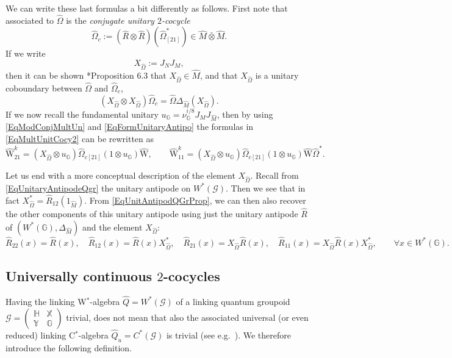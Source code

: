 \documentclass[reqno]{amsart}
\numberwithin{equation}{section}
\newcommand{\G}{\mathbb{G}}
\newcommand{\Hh}{\mathbb{H}}
\newcommand{\X}{\mathbb{X}}
\newcommand{\Y}{\mathbb{Y}}
\newcommand{\msG}{\mathscr{G}}
\newcommand{\ww}{\mathrm{W}}
\begin{document}
We can write these last formulas a bit differently as follows. First note that associated to $\hat{\Omega}$ is the \emph{conjugate unitary $2$-cocycle}
\[
\hat{\Omega}_c :=  (\hat{R}\otimes \hat{R})(\hat{\Omega}_{[21]}^*) \in \hat{M}\bar{\otimes}\hat{M}. 
\]
If we write 
\[
X_{\hat{\Omega}} := J_NJ_M,
\]
then it can be shown \cite{DC11b}*{Proposition 6.3} that $X_{\hat{\Omega}}\in \hat{M}$, and that $X_{\hat{\Omega}}$ is a unitary coboundary between $\hat{\Omega}$ and $\hat{\Omega}_c$,
\begin{equation}
(X_{\hat{\Omega}}\otimes X_{\hat{\Omega}})\hat{\Omega}_c = \hat{\Omega}\Delta_{\hat{M}}(X_{\hat{\Omega}}). 
\end{equation}
If we now recall the fundamental unitary $u_{\G} = \nu_{\G}^{i/8}J_{M}J_{\hat{M}}$, then by using \eqref{EqModConjMultUn} and \eqref{EqFormUnitaryAntipo} the formulas in \eqref{EqMultUnitCocy2} can be rewritten as 
\[
\hat{\ww}^k_{21} = (X_{\hat{\Omega}} \otimes u_{\G})\hat{\Omega}_{c[21]}(1\otimes u_{\G})\hat{\ww},\qquad \hat{\ww}^k_{11} = (X_{\hat{\Omega}} \otimes u_{\G})\hat{\Omega}_{c[21]}(1\otimes u_{\G})\hat{\ww}\hat{\Omega}^*. 
\]



Let us end with a more conceptual description of the element $X_{\hat{\Omega}}$. Recall from \eqref{EqUnitaryAntipodeQgr} the unitary antipode on $W^*(\msG)$. Then we see that in fact $X_{\hat{\Omega}}^* = \hat{R}_{12}(1_{\hat{M}})$. From \eqref{EqUnitAntipodQGrProp}, we can then also recover the other components of this unitary antipode using just the unitary antipode $\hat{R}$ of $(W^*(\G),\Delta_{\hat{M}})$ and the element $X_{\hat{\Omega}}$:
\begin{equation}\label{eq12}
\hat{R}_{22}(x)= \hat{R}(x),\quad \hat{R}_{12}(x) =\hat{R}(x) X_{\hat{\Omega}}^*,\quad \hat{R}_{21}(x) = X_{\hat{\Omega}} \hat{R}(x),\quad \hat{R}_{11}(x) = X_{\hat{\Omega}}\hat{R}(x)X_{\hat{\Omega}}^*,\qquad \forall x\in W^*(\G). 
\end{equation}


\subsection{Universally continuous \texorpdfstring{$2$}{2}-cocycles}

Having the linking W$^*$-algebra $\hat{Q} = W^*(\msG)$ of a linking quantum groupoid $\msG = \begin{pmatrix} \Hh & \X\\ \Y & \G\end{pmatrix}$ trivial, does not mean that also the associated universal (or even reduced) linking C$^*$-algebra $\hat{Q}_u = C^*(\msG)$ is trivial (see e.g.\ \cite{DC10}). We therefore introduce the following definition.
\end{document}
